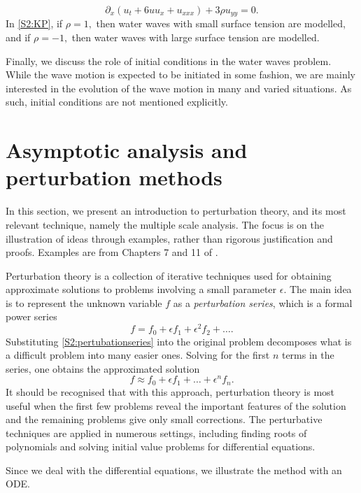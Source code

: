 \begin{itemize}
\begin{equation}\label{S2:KP}
\partial_x(u_t + 6uu_x + u_{xxx}) + 3 \rho u_{yy} = 0.
\end{equation}
In \eqref{S2:KP}, if $\rho = 1,$ then water waves with small surface tension are modelled, and if $\rho = -1,$ then water waves with large surface tension are modelled.
\end{itemize}
Finally, we discuss the role of initial conditions in the water waves problem. While the wave motion is expected to be initiated in some fashion, we are mainly interested in the evolution of the wave motion in many and varied situations. As such, initial conditions are not mentioned explicitly. 

\section{Asymptotic analysis and perturbation methods}
In this section, we present an introduction to perturbation theory, and its most relevant technique, namely the multiple scale analysis. The focus is on the illustration of ideas through examples, rather than rigorous justification and proofs. Examples are from Chapters 7 and 11 of \cite{BO}.

Perturbation theory is a collection of iterative techniques used for obtaining approximate solutions to problems involving a small parameter $\epsilon$. The main idea is to represent the unknown variable $f$ as a \textit{perturbation series}, which is a formal power series 
\begin{equation}\label{S2:pertubationseries}
f = f_0 + \epsilon f_1 + \epsilon^2 f_2 + \ldots.
\end{equation} 
Substituting \eqref{S2:pertubationseries} into the original problem decomposes what is a difficult problem  into many easier ones. Solving for the first $n$ terms in the series, one obtains the approximated solution 
\[f \approx f_0 + \epsilon f_1 + \ldots + \epsilon^n f_n.\]
It should be recognised that with this approach, perturbation theory is most useful when the first few problems reveal the important features of the solution and the remaining problems give only small corrections. The perturbative techniques are applied in numerous settings, including finding roots of polynomials and solving initial value problems for differential equations.

Since we deal with the differential equations, we illustrate the method with an ODE.

\label{S2:example}

